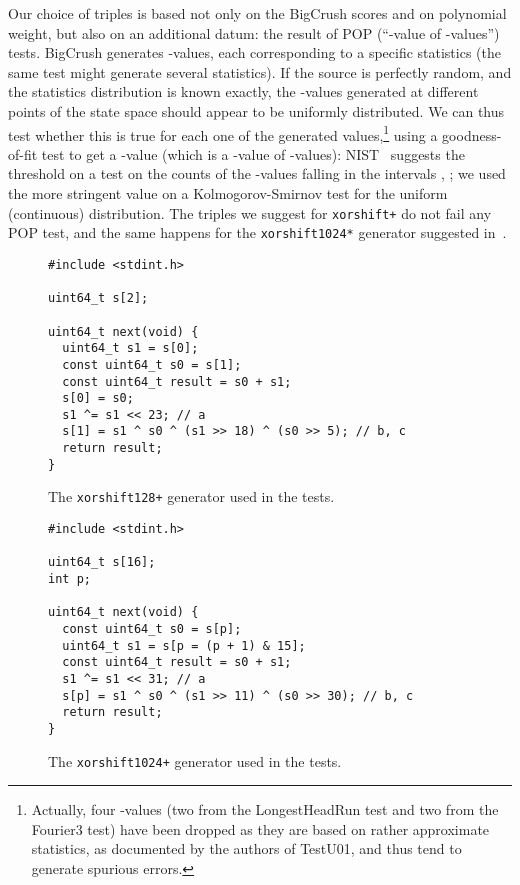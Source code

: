 \documentclass{acmsmalltr}
\newcommand{\xorshifts}[1][]{\texttt{xorshift#1*}\xspace}
\newcommand{\xorshiftp}[1][]{\texttt{xorshift#1+}\xspace}
\begin{document}
Our choice of triples is based not only on the BigCrush scores and on polynomial
weight, but also on an additional datum: the result of POP
(``-value of -values'') tests. BigCrush generates  -values, each
corresponding to a specific statistics (the same test might generate several
statistics). If the source is perfectly random, and the statistics 
distribution is known exactly, the -values generated at different points of
the state space should appear to be uniformly distributed. 
We can thus test whether this is true for each one of
the  generated values,\footnote{Actually, four -values (two from the LongestHeadRun test and two from the Fourier3 test) have been dropped as
they are based on rather approximate statistics, as documented by the authors of 
TestU01, and thus tend to generate spurious errors.} using a goodness-of-fit
test to get a -value (which is a -value of -values):
NIST~\cite{RSNSTSRPNGCA} suggests the threshold  on a  test on the counts of the -values
falling in the intervals , ; we
used the more stringent value  on a Kolmogorov-Smirnov test for the
uniform (continuous) distribution. The triples we suggest for \xorshiftp do
not fail any POP test, and the same happens for the \xorshifts[1024] generator
suggested in~\cite{VigEEMXGS}.



\begin{figure}[ht]
\centering
\begin{verbatim}
#include <stdint.h>

uint64_t s[2];

uint64_t next(void) { 
  uint64_t s1 = s[0];
  const uint64_t s0 = s[1];
  const uint64_t result = s0 + s1;
  s[0] = s0;
  s1 ^= s1 << 23; // a
  s[1] = s1 ^ s0 ^ (s1 >> 18) ^ (s0 >> 5); // b, c
  return result; 
}
\end{verbatim}
\caption{\label{fig:code128}The \xorshiftp[128] generator used in the tests.}
\end{figure}



\begin{figure}[ht]
\centering
\begin{verbatim}
#include <stdint.h>

uint64_t s[16];
int p;

uint64_t next(void) {
  const uint64_t s0 = s[p];
  uint64_t s1 = s[p = (p + 1) & 15];
  const uint64_t result = s0 + s1;
  s1 ^= s1 << 31; // a
  s[p] = s1 ^ s0 ^ (s1 >> 11) ^ (s0 >> 30); // b, c
  return result;
}
\end{verbatim}
\caption{\label{fig:code1024}The \xorshiftp[1024] generator used
in the tests.}
\end{figure}
\end{document}
